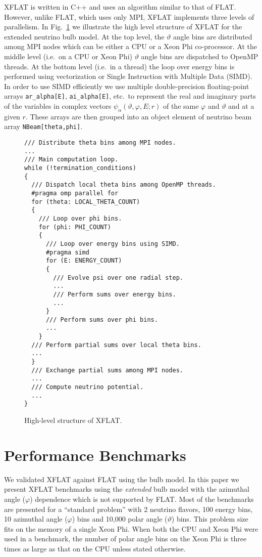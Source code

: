 \documentclass{sig-alternate}
\begin{document}
XFLAT is written in C++ and uses an algorithm similar to that of FLAT.
However, unlike FLAT, which uses only MPI, XFLAT implements three levels of
parallelism. In Fig.~\ref{fig:xflat} we illustrate the high level
structure of XFLAT for the extended neutrino bulb model. 
At the top level, the $\vartheta$ angle bins are distributed among MPI 
nodes which can be either a CPU or a Xeon Phi co-processor. At the
middle level (i.e.\ on a CPU or Xeon Phi) $\vartheta$ angle bins are
dispatched to OpenMP threads. At the 
bottom level (i.e.\ in a thread) the loop over energy bins is
performed using vectorization or Single Instruction with Multiple
Data (SIMD). In order to use SIMD efficiently we use multiple
double-precision floating-point arrays
\texttt{ar\_alpha[E]}, \texttt{ai\_alpha[E]}, etc.\ to represent the real
and imaginary parts of the variables in complex vectors
$\psi_\alpha(\vartheta,\varphi,E;r)$ of the same $\varphi$
and $\vartheta$ and at a given $r$. These arrays are then grouped into
an object element of neutrino beam array \texttt{NBeam[theta,phi]}.

\begin{figure}
\begin{verbatim}
/// Distribute theta bins among MPI nodes.
...
/// Main computation loop.
while (!termination_conditions)
{
  /// Dispatch local theta bins among OpenMP threads.
  #pragma omp parallel for
  for (theta: LOCAL_THETA_COUNT)
  {
    /// Loop over phi bins.
    for (phi: PHI_COUNT)
    {
      /// Loop over energy bins using SIMD.
      #pragma simd
      for (E: ENERGY_COUNT)
      {
        /// Evolve psi over one radial step.
        ...
        /// Perform sums over energy bins.
        ...
      }
      /// Perform sums over phi bins.
      ...
    }
  /// Perform partial sums over local theta bins.
  ...
  }
  /// Exchange partial sums among MPI nodes.
  ...
  /// Compute neutrino potential.
  ...
}
\end{verbatim}
\caption{High-level structure of XFLAT.}
\label{fig:xflat}
\end{figure}



\section{Performance Benchmarks}
We validated XFLAT against FLAT using the bulb model. In this paper we present
XFLAT benchmarks using the \emph{extended} bulb
model with the azimuthal angle ($\varphi$) dependence which is not
supported by FLAT. Most of the benchmarks are presented for a
``standard problem'' with 2
neutrino flavors, 100 energy bins, 10 azimuthal angle ($\varphi$)
bins and 10,000 polar angle ($\vartheta$) bins. This problem size fits on the
memory of a single Xeon Phi.
When both the CPU and Xeon Phi were used in a benchmark, the number of
polar angle bins on the Xeon Phi 
is three times as large as that on the CPU unless stated otherwise.
\end{document}
